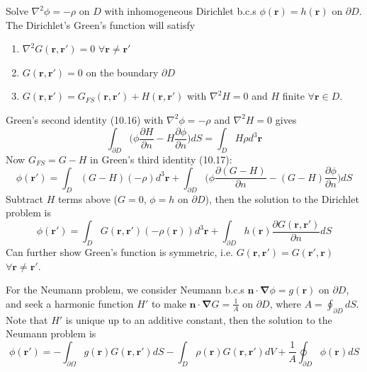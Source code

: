 \documentclass[a4paper]{article}
\begin{document}
\begin{eg}
Solve $\nabla^2\phi=-\rho$ on $D$ with inhomogeneous Dirichlet b.c.s $\phi(\mathbf{r})=h(\mathbf{r})$ on $\partial D$. The Dirichlet's Green's function will satisfy
\begin{enumerate}
    \item $\nabla^2G(\mathbf{r},\mathbf{r'})=0$ $\forall\mathbf{r}\neq\mathbf{r'}$
    \item $G(\mathbf{r},\mathbf{r'})=0$ on the boundary $\partial D$
    \item $G(\mathbf{r},\mathbf{r'})=G_{FS}(\mathbf{r},\mathbf{r'})+H(\mathbf{r},\mathbf{r'})$ with $\nabla^2H=0$ and $H$ finite $\forall\mathbf{r}\in D$.
\end{enumerate}
Green's second identity (10.16) with $\nabla^2\phi=-\rho$ and $\nabla^2H=0$ gives
$$\int_{\partial D}\bigg(\phi\frac{\partial H}{\partial n}-H\frac{\partial\phi}{\partial n}\bigg)dS=\int_DH\rho d^3\mathbf{r}$$
Now $G_{FS}=G-H$ in Green's third identity (10.17):
$$\phi(\mathbf{r'})=\int_D(G-H)(-\rho)d^3\mathbf{r}+\int_{\partial D}\bigg(\phi\frac{\partial(G-H)}{\partial n}-(G-H)\frac{\partial\phi}{\partial n}\bigg)dS$$
Subtract $H$ terms above ($G=0$, $\phi=h$ on $\partial D$), then the solution to the Dirichlet problem is
\begin{equation}
    \phi(\mathbf{r'})=\int_DG(\mathbf{r},\mathbf{r'})(-\rho(\mathbf{r}))d^3\mathbf{r}+\int_{\partial D}h(\mathbf{r})\frac{\partial G(\mathbf{r},\mathbf{r'})}{\partial n}dS\tag{10.18}
\end{equation}
Can further show Green's function is symmetric, i.e. $G(\mathbf{r},\mathbf{r'})=G(\mathbf{r'},\mathbf{r})$ $\forall\mathbf{r}\neq\mathbf{r'}$.
\end{eg}
\begin{eg}
For the Neumann problem, we consider Neumann b.c.s $\mathbf{n}\cdot\boldsymbol{\nabla}\phi=g(\mathbf{r})$ on $\partial D$, and seek a harmonic function $H'$ to make $\mathbf{n}\cdot\boldsymbol{\nabla}G=\frac{1}{A}$ on $\partial D$, where $A=\oint_{\partial D}dS$. Note that $H'$ is unique up to an additive constant, then the solution to the Neumann problem is
\begin{equation}
\phi(\mathbf{r'})=-\int_{\partial\Omega}g(\mathbf{r})G(\mathbf{r},\mathbf{r'})dS-\int_D\rho(\mathbf{r})G(\mathbf{r},\mathbf{r'})dV+\frac{1}{A}\oint_{\partial D}\phi(\mathbf{r})dS\tag{10.19}
\end{equation}
\end{eg}
\end{document}
